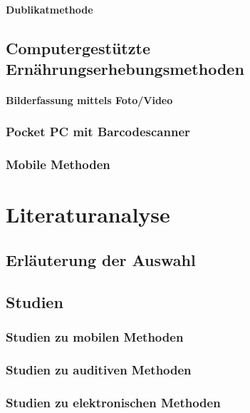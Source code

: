 \paragraph{Dublikatmethode}


\subsection{Computergestützte Ernährungserhebungsmethoden}

\paragraph{Bilderfassung mittels Foto/Video}

\subsubsection{Pocket PC mit Barcodescanner}

\subsubsection{Mobile Methoden}

\section{Literaturanalyse}

\subsection{Erläuterung der Auswahl}

\subsection{Studien}
\subsubsection{Studien zu mobilen Methoden}
\subsubsection{Studien zu auditiven Methoden}
\subsubsection{Studien zu elektronischen Methoden}




